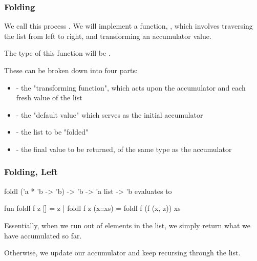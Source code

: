 \documentclass[aspectratio=169]{beamer}
\begin{document}
\begin{frame}[fragile]
  \frametitle{Folding}

  We call this process . We will implement a function, , which
  involves traversing the list from left to right, and transforming an accumulator
  value.

  \pause
  \vspace{\fill}

  The type of this function will be .

  \pause
  \vspace{\fill}

  These can be broken down into four parts:
  \pause
  \begin{itemize}
    \item {} - the "transforming function", which acts upon the
    accumulator and each fresh value of the list \pause
    \item {} - the "default value" which serves as the initial accumulator \pause
    \item {} - the list to be "folded" \pause
    \item {} - the final value to be returned, of the same type as the accumulator
  \end{itemize}
\end{frame}

\begin{frame}[fragile]
  \frametitle{Folding, Left}

  \spec
    {foldl}
    {('a * 'b -> 'b) -> 'b -> 'a list -> 'b}
    {}
    { evaluates to }

  \pause
  \begin{codeblock}
    fun foldl f z [] = z
      | foldl f z (x::xs) = foldl f (f (x, z)) xs
  \end{codeblock}

  \pause
  \vspace{\fill}

  Essentially, when we run out of elements in the list, we simply return
  what we have accumulated so far.

  \pause
  \vspace{\fill}

  Otherwise, we update our accumulator and keep recursing through the list.
\end{frame}
\end{document}
